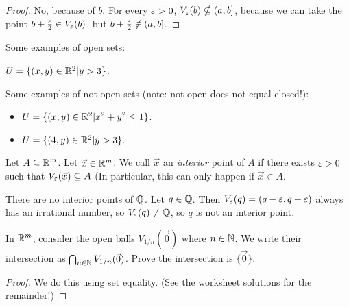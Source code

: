 \begin{proof}
No, because of $b$. For every $\varepsilon > 0$, $V_\varepsilon(b) \nsubseteq (a,b]$, because we can take the point $b + \frac {\varepsilon} 2 \in V_\varepsilon(b)$, but $b + \frac {\varepsilon} 2 \notin (a,b]$.
\end{proof}

Some examples of open sets:
\begin{example}
$U = \{(x,y) \in \mathbb{R}^2 | y > 3\}$.
\end{example}

Some examples of not open sets (note: not open does not equal closed!):
\begin{example}\quad
\begin{itemize}
    \item $U = \{(x, y) \in \mathbb{R}^2 | x^2 + y^2 \le 1\}$.
    \item $U = \{(4,y) \in \mathbb{R}^2 | y > 3\}$.
\end{itemize}
\end{example}

\begin{definition}
Let $A \subseteq \mathbb{R}^m$. Let $\vec x \in \mathbb{R}^m$. We call $\vec x$ an \textit{interior} point of $A$ if there exists $\varepsilon > 0$ such that $V_{\varepsilon}(\vec x) \subseteq A$ (In particular, this can only happen if $\vec x \in A$.
\end{definition}

\begin{example}
There are no interior points of $\mathbb{Q}$. Let $q \in \mathbb{Q}$. Then $V_\varepsilon(q) = (q - \varepsilon, q + \varepsilon)$ always has an irrational number, so $V_\varepsilon(q) \neq \mathbb{Q}$, so $q$ is not an interior point.
\end{example}

\begin{example}
In $\mathbb{R}^m$, consider the open balls $V_{1/n}(\vec 0)$ where $n \in \mathbb{N}$. We write their intersection as $\bigcap_{n \in \mathbb{N}} V_{1/n}(\vec 0)$. Prove the intersection is $\{\vec 0\}$.
\end{example}

\begin{proof}
We do this using set equality. (See the worksheet solutions for the remainder!)
\end{proof}